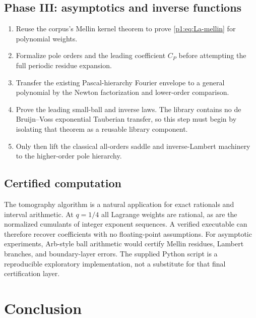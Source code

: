 \documentclass[11pt,oneside]{article}
\numberwithin{equation}{section}
\theoremstyle{definition}
\theoremstyle{remark}
\begin{document}
\subsection{Phase III: asymptotics and inverse functions}

\begin{enumerate}
\item Reuse the corpus's Mellin kernel theorem to prove \eqref{p1:eq:La-mellin} for polynomial
      weights.
\item Formalize pole orders and the leading coefficient $C_P$ before attempting the full
      periodic residue expansion.
\item Transfer the existing Pascal-hierarchy Fourier envelope to a general polynomial by
      the Newton factorization and lower-order comparison.
\item Prove the leading small-ball and inverse laws.  The library contains no de
      Bruijn--Voss exponential Tauberian transfer, so this step must begin by isolating that
      theorem as a reusable library component.
\item Only then lift the classical all-orders saddle and inverse-Lambert machinery to the
      higher-order pole hierarchy.
\end{enumerate}

\subsection{Certified computation}

The tomography algorithm is a natural application for exact rationals and interval
arithmetic.  At $q=1/4$ all Lagrange weights are rational, as are the normalized cumulants of
integer exponent sequences.  A verified executable can therefore recover coefficients with
no floating-point assumptions.  For asymptotic experiments, Arb-style ball arithmetic would
certify Mellin residues, Lambert branches, and boundary-layer errors.  The supplied Python
script is a reproducible exploratory implementation, not a substitute for that final
certification layer.


\section{Conclusion}
\label{p1:sec:conclusion}
\end{document}
